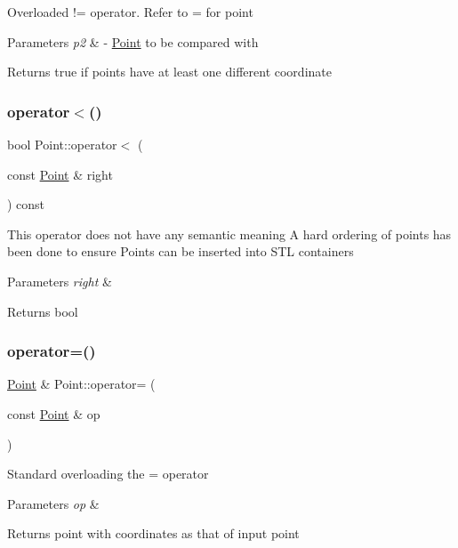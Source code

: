 Overloaded != operator. Refer to = for point 
\begin{DoxyParams}{Parameters}
{\em p2} & -\/ \hyperlink{classPoint}{Point} to be compared with \\
\hline
\end{DoxyParams}
\begin{DoxyReturn}{Returns}
true if points have at least one different coordinate 
\end{DoxyReturn}
\mbox{\label{classPoint_a2d285a505e84d64a96974d5247e8ae7a}} 
\subsubsection{\texorpdfstring{operator$<$()}{operator<()}}
{\footnotesize\ttfamily bool Point\+::operator$<$ (\begin{DoxyParamCaption}\item[{const \hyperlink{classPoint}{Point} \&}]{right }\end{DoxyParamCaption}) const}

This operator does not have any semantic meaning A hard ordering of points has been done to ensure Points can be inserted into S\+TL containers 
\begin{DoxyParams}{Parameters}
{\em right} & \\
\hline
\end{DoxyParams}
\begin{DoxyReturn}{Returns}
bool 
\end{DoxyReturn}
\mbox{\label{classPoint_a2e142edc132377fdc6873f6549daab2d}} 
\subsubsection{\texorpdfstring{operator=()}{operator=()}}
{\footnotesize\ttfamily \hyperlink{classPoint}{Point} \& Point\+::operator= (\begin{DoxyParamCaption}\item[{const \hyperlink{classPoint}{Point} \&}]{op }\end{DoxyParamCaption})}

Standard overloading the = operator 
\begin{DoxyParams}{Parameters}
{\em op} & \\
\hline
\end{DoxyParams}
\begin{DoxyReturn}{Returns}
point with coordinates as that of input point 
\end{DoxyReturn}
\mbox{\label{classPoint_ac7bc64b9a683d5fb35780c739779f2fc}} 
